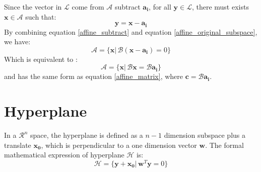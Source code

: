 \documentclass[10pt,a4paper]{article}
\begin{document}
Since the vector in $\mathcal{L}$ come from $\mathcal{A}$ subtract $\mathbf{a_{i}}$, for all $\mathbf{y} \in \mathcal{L}$, there must exists $\mathbf{x} \in \mathcal{A}$ such that: 
\begin{equation}
	\mathbf{y} = \mathbf{x} - \mathbf{a_{i}}
	\label{affine_subtract}
\end{equation}
By combining equation \ref{affine_subtract} and equation \ref{affine_original_subspace}, we have:
\begin{equation*}
	\mathcal{A} = \{ \mathbf{x} |\, \mathcal{B} (\mathbf{x} - \mathbf{a_{i}}) = 0 \}
\end{equation*}
Which is equivalent to :
\begin{equation*}
	\mathcal{A} = \{ \mathbf{x} |\, \mathcal{B} \mathbf{x} = \mathcal{B} \mathbf{a_{i}} \}
\end{equation*}
and has the same form as equation \ref{affine_matrix}, where $\mathbf{c} = \mathcal{B} \mathbf{a_{i}}$.

\section{Hyperplane}
In a $\mathcal{R}^{n}$ space, the hyperplane is defined as a $n - 1$ dimension subspace plus a translate $\mathbf{x_{0}}$, which is perpendicular to a one dimension vector $\mathbf{w}$. The formal mathematical expression of hyperplane $\mathcal{H}$ is:
\begin{equation}
	\mathcal{H} = \{ \mathbf{y} + \mathbf{x_{0}} |\, \mathbf{w}^{T}\mathbf{y} = 0  \}
\end{equation}
\end{document}
